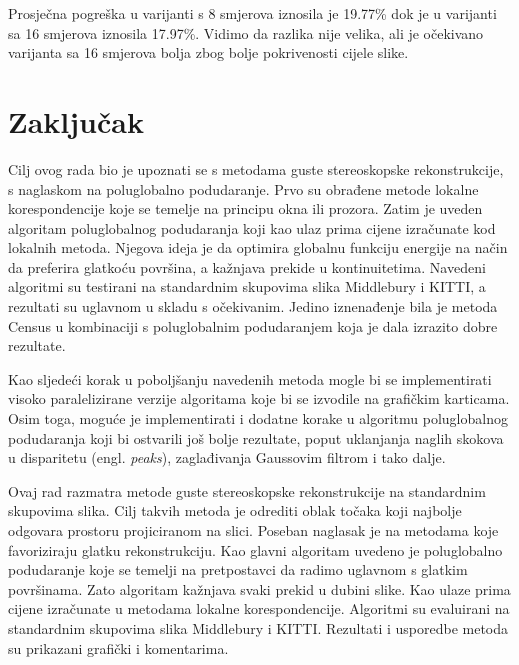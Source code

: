 \documentclass[utf8, zavrsni, numeric]{fer}
\begin{document}
Prosječna pogreška u varijanti s 8 smjerova iznosila je 19.77\% dok je u varijanti sa 16
smjerova iznosila 17.97\%. Vidimo da razlika nije velika, ali je očekivano varijanta sa 16 smjerova bolja zbog bolje pokrivenosti cijele slike.

\chapter{Zaključak}
Cilj ovog rada bio je upoznati se s metodama guste stereoskopske rekonstrukcije, s naglaskom
na poluglobalno podudaranje. Prvo su obrađene metode lokalne korespondencije koje se temelje
na principu okna ili prozora. Zatim je uveden algoritam poluglobalnog podudaranja koji kao ulaz
prima cijene izračunate kod lokalnih metoda. Njegova ideja je da optimira globalnu funkciju energije na način da preferira glatkoću površina, a kažnjava prekide u kontinuitetima.
Navedeni algoritmi su testirani na standardnim skupovima slika Middlebury i KITTI, a rezultati
su uglavnom u skladu s očekivanim. Jedino iznenađenje bila je metoda Census u kombinaciji s poluglobalnim podudaranjem koja je dala izrazito dobre rezultate.

Kao sljedeći korak u poboljšanju navedenih metoda mogle bi se implementirati visoko paralelizirane verzije algoritama
koje bi se izvodile na grafičkim karticama. Osim toga, moguće je implementirati i dodatne
korake u algoritmu poluglobalnog podudaranja koji bi ostvarili još bolje rezultate, poput
uklanjanja naglih skokova u disparitetu (engl. {\sl peaks}), zaglađivanja Gaussovim filtrom i tako dalje.




\begin{sazetak}
  Ovaj rad razmatra metode guste stereoskopske rekonstrukcije na standardnim skupovima slika.
  Cilj takvih metoda je odrediti oblak točaka koji najbolje odgovara prostoru projiciranom
  na slici.
  Poseban naglasak je na metodama koje favoriziraju glatku rekonstrukciju. Kao glavni
  algoritam uvedeno je poluglobalno podudaranje koje se temelji na pretpostavci da radimo
  uglavnom s glatkim površinama. Zato algoritam kažnjava svaki prekid u dubini slike. Kao
  ulaze prima cijene izračunate u metodama lokalne korespondencije. Algoritmi su
  evaluirani na standardnim skupovima slika Middlebury i KITTI. Rezultati i usporedbe metoda su prikazani
  grafički i komentarima.

\end{sazetak}
\end{document}
